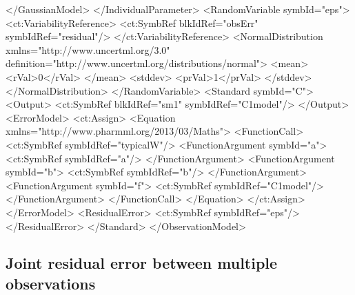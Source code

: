 \documentclass[a4paper,10pt]{article}
\begin{document}
\begin{xmlcode}
        </GaussianModel>
    </IndividualParameter>
    <RandomVariable symbId="eps">
        <ct:VariabilityReference>
            <ct:SymbRef blkIdRef="obsErr" symbIdRef="residual"/>
        </ct:VariabilityReference>
        <NormalDistribution xmlns="http://www.uncertml.org/3.0" definition="http://www.uncertml.org/distributions/normal">
            <mean>
                <rVal>0</rVal> 
            </mean>
            <stddev>
                <prVal>1</prVal> 
            </stddev>
        </NormalDistribution>
    </RandomVariable>
    <Standard symbId="C">
        <Output>
            <ct:SymbRef blkIdRef="sm1" symbIdRef="C1model"/>
        </Output>
        <ErrorModel>
            <ct:Assign>
                <Equation xmlns="http://www.pharmml.org/2013/03/Maths">
                    <FunctionCall>
                        <ct:SymbRef symbIdRef="typicalW"/>
                        <FunctionArgument symbId="a">
                            <ct:SymbRef symbIdRef="a"/>
                        </FunctionArgument>
                        <FunctionArgument symbId="b">
                            <ct:SymbRef symbIdRef="b"/>
                        </FunctionArgument>
                        <FunctionArgument symbId="f">
                            <ct:SymbRef symbIdRef="C1model"/>
                        </FunctionArgument>
                    </FunctionCall>
                </Equation>
            </ct:Assign>
        </ErrorModel>
        <ResidualError>
            <ct:SymbRef symbIdRef="eps"/>
        </ResidualError>
    </Standard>
</ObservationModel>
\end{xmlcode}

\subsection{Joint residual error between multiple observations}
\label{modelKK_RM2}

\end{document}

